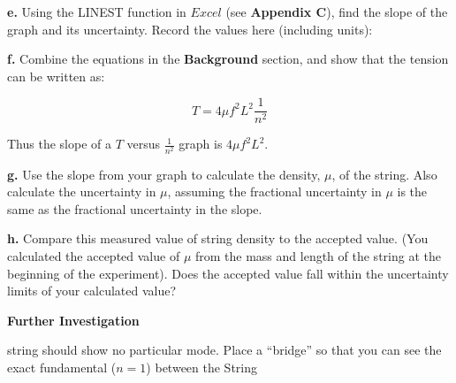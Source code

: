 \textbf{e. } Using the LINEST function in $Excel$ (see \textbf{Appendix C}), find the slope of the graph and its uncertainty. Record the values here
(including units):

\vspace{20mm}

\textbf{f. } Combine the equations in the \textbf{Background } section, and show that the tension can be written as:

\begin{equation}
T=4\mu f^{2}L^{2}\frac{1}{n^2}
\end{equation}

\vspace{25mm}

Thus the slope of a $T$ versus $\frac{1}{n^2}$ graph is $4\mu f^{2}L^{2}$.

\textbf{g. } Use the slope from your graph to calculate the density, $\mu $, of the string. Also calculate the uncertainty in $\mu$, assuming the
fractional uncertainty in $\mu$ is the same as the fractional uncertainty in the slope.

\vspace{5cm}

\textbf{h. } Compare this measured value of string density to the accepted value. (You calculated the accepted value of $\mu $ from the mass and
length of the string at the beginning of the experiment). Does the accepted value fall within the uncertainty limits of your calculated value?

\vspace{50mm}




\textbf{Further Investigation}

string should show no particular mode. Place a ``bridge'' so that you can see the exact fundamental ($n = 1$) between the String


